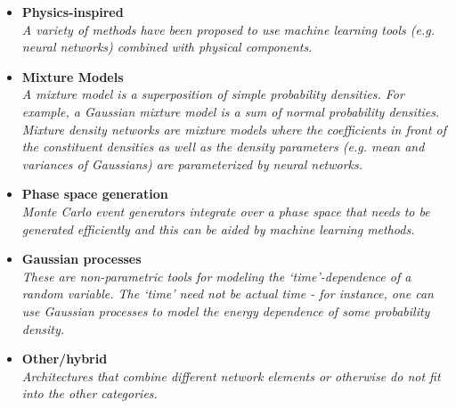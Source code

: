 \documentclass[12pt,letterpaper]{article}
\begin{document}
\begin{itemize}
\begin{itemize}
		\item \textbf{Physics-inspired}~\cite{Abasov:2024hyq,Larkoski:2023xam,Barenboim:2021vzh,Lai:2020byl,1808876,Andreassen:2019txo,Andreassen:2018apy}
		\\\textit{A variety of methods have been proposed to use machine learning tools (e.g. neural networks) combined with physical components.}
		\item \textbf{Mixture Models}~\cite{Vermunt:2023fsr,Liu:2022dem,Graziani:2021vai,Burton:2021tsd,Chen:2020uds}
		\\\textit{A mixture model is a superposition of simple probability densities.  For example, a Gaussian mixture model is a sum of normal probability densities.  Mixture density networks are mixture models where the coefficients in front of the constituent densities as well as the density parameters (e.g. mean and variances of Gaussians) are parameterized by neural networks.}
		\item \textbf{Phase space generation}~\cite{Deutschmann:2024lml,Calisto:2023vmm,Singh:2023yvj,Renteria-Estrada:2023buo,Heimel:2022wyj,Jinno:2022sbr,Maitre:2022xle,Yoon:2020zmb,Danziger:2021eeg,Backes:2020vka,Verheyen:2020bjw,Chen:2020nfb,Nachman:2020fff,Carrazza:2020rdn,Klimek:2018mza,Gao:2020vdv,Gao:2020zvv,Bothmann:2020ywa,Bendavid:2017zhk}
		\\\textit{Monte Carlo event generators integrate over a phase space that needs to be generated efficiently and this can be aided by machine learning methods.}
		\item \textbf{Gaussian processes}~\cite{Cisbani:2019xta,1804325,Bertone:2016mdy,Frate:2017mai}
		\\\textit{These are non-parametric tools for modeling the `time'-dependence of a random variable.  The `time' need not be actual time - for instance, one can use Gaussian processes to model the energy dependence of some probability density.}
		\item \textbf{Other/hybrid}~\cite{Sahu:2023uwb,Santos:2023mib,Kronheim:2023jrl,Butter:2023fov,Kansal:2022spb,Li:2022jon,DiBello:2022rss,Cresswell:2022tof}
		\\\textit{Architectures that combine different network elements or otherwise do not fit into the other categories.}
	\end{itemize}

\end{itemize}
\end{document}

